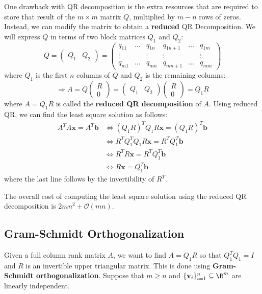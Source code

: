 \noindent One drawback with QR decomposition is the extra resources that are required to store that result of the $m \times m$ matrix $Q$, multiplied by $m - n$ rows of zeros. Instead, we can modify the matrix to obtain a \textbf{reduced} QR Decomposition. We will express $Q$ in terms of two block matrices $Q_1$ and $Q_2$:
\[Q=\left(\begin{array}{ll}Q_1 & Q_2\end{array}\right)=\left(\begin{array}{cccccc}q_{11} & \ldots & q_{1 n} & q_{1 n+1} & \ldots & q_{1 m} \\ \vdots & & \vdots & \vdots & & \vdots \\ q_{m 1} & \ldots & q_{m n} & q_{m n+1} & \ldots & q_{m m}\end{array}\right)\]
where $Q_1$ is the first $n$ columns of $Q$ and $Q_2$ is the remaining columns:
\[\Rightarrow A=Q\left(\begin{array}{c}R \\ 0\end{array}\right)=\left(\begin{array}{ll}Q_1 & Q_2\end{array}\right)\left(\begin{array}{c}R \\ 0\end{array}\right)=Q_1 R\]
where $A = Q_1 R$ is called the \textbf{reduced QR decomposition} of $A$. Using reduced QR, we can find the least square solution as follows:
\[\begin{aligned} A^T A \boldsymbol{x}=A^T \boldsymbol{b} & \Leftrightarrow\left(Q_1 R\right)^T Q_1 R \boldsymbol{x}=\left(Q_1 R\right)^T \boldsymbol{b} \\ & \Leftrightarrow R^T Q_1^T Q_1 R \boldsymbol{x}=R^T Q_1^T \boldsymbol{b} \\ & \Leftrightarrow R^T R \boldsymbol{x}=R^T Q_1^T \boldsymbol{b} \\ & \Leftrightarrow R \boldsymbol{x}=Q_1^T \boldsymbol{b}\end{aligned}\]
where the last line follows by the invertibility of $R^T$.

\begin{rmk}
	The overall cost of computing the least square solution using the reduced QR decomposition is $2 m n^2+\mathcal{O}(m n)$.
\end{rmk}

\subsection{Gram-Schmidt Orthogonalization}
Given a full column rank matrix $A$, we want to find $A = Q_1 R$ so that $Q_1^T Q_1=I$ and $R$ is an invertible upper triangular matrix. This is done using \textbf{Gram-Schmidt orthogonalization}. Suppose that $m \geq n$ and $\{\mathbf{v}_i\}_{i=1}^n \subseteq \R^m$ are linearly independent.

